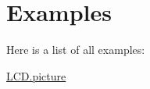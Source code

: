\section{Examples}
Here is a list of all examples\-:\begin{DoxyCompactItemize}
\item 
\hyperlink{_l_c_d_8picture-example}{L\-C\-D.\-picture}
\end{DoxyCompactItemize}
